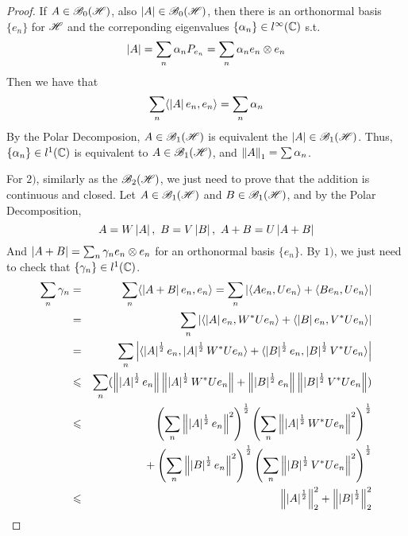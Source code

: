 \documentclass[a4paper,11pt]{report}
\begin{document}
\begin{proof}
	If $A \in \mathscr{B}_{0}\mathscr{(H)}$, also $\left\lvert A\right\lvert \in \mathscr{B}_{0}\mathscr{(H)}$, then there is an orthonormal basis $\{e_n\}$ for $\mathscr{H}$ and the correponding eigenvalues $\{\alpha_n\} \in l^{\infty}(\mathbb{C})$ s.t.
	\begin{equation*}
		\left\lvert A\right\lvert = \sum_{n} \alpha_n P_{e_n} = \sum_{n} \alpha_n e_n \otimes e_n
	\end{equation*}
	Then we have that
	\begin{equation*}
		\sum_n \langle \left\lvert A\right\lvert e_n, e_n \rangle = \sum_n \alpha_n
	\end{equation*}
	By the Polar Decomposion, $A \in \mathscr{B}_{1}\mathscr{(H)}$ is equivalent the $\left\lvert A\right\lvert \in \mathscr{B}_{1}\mathscr{(H)}$. Thus, $\{\alpha_n\} \in l^{1}(\mathbb{C})$ is equivalent to $A \in \mathscr{B}_{1}\mathscr{(H)}$, and $\left\lVert A\right\lVert_1 = \sum \alpha_n$.
	\item For $2)$, similarly as the $\mathscr{B}_{2}\mathscr{(H)}$, we just need to prove that the addition is continuous and closed. Let $A \in \mathscr{B}_{1}\mathscr{(H)}$ and $B \in \mathscr{B}_{1}\mathscr{(H)}$, and by the Polar Decomposition,
	\begin{equation*}
		A = W\left\lvert A\right\lvert,~ B = V \left\lvert B\right\lvert,~ A+B = U\left\lvert A+B\right\lvert
	\end{equation*}
	And $\left\lvert A+B\right\lvert = \sum_{n} \gamma_n e_n \otimes e_n$ for an orthonormal basis $\{e_n\}$. By $1)$, we just need to check that $\{\gamma_n\} \in l^{1}(\mathbb{C})$.
	\begin{eqnarray*}
		\sum_n \gamma_n &=& \sum_n \langle \abs{A+B}e_n,e_n \rangle = \sum_n \abs{\langle Ae_n, Ue_n \rangle + \langle Be_n, Ue_n \rangle} \\
		&=& \sum_n \abs{\langle \abs{A}e_n, \st{W}Ue_n \rangle + \langle \abs{B}e_n, \st{V}Ue_n \rangle} \\
		&=& \sum_n \abs{\langle \abs{A}^{\frac{1}{2}}e_n, \abs{A}^{\frac{1}{2}}\st{W}Ue_n \rangle + \langle \abs{B}^{\frac{1}{2}}e_n, \abs{B}^{\frac{1}{2}}\st{V}Ue_n \rangle} \\
		&\leqslant& \sum_n (\norm{\abs{A}^{\frac{1}{2}}e_n}\norm{\abs{A}^{\frac{1}{2}}\st{W}Ue_n}+\norm{\abs{B}^{\frac{1}{2}}e_n}\norm{\abs{B}^{\frac{1}{2}}\st{V}Ue_n}) \\
		&\leqslant& \left(\sum_n \norm{\abs{A}^{\frac{1}{2}}e_n}^2 \right)^{\frac{1}{2}}\left(\sum_n \norm{\abs{A}^{\frac{1}{2}}\st{W}Ue_n}^2 \right)^{\frac{1}{2}} \\
		&& \negmedspace{} + \left(\sum_n \norm{\abs{B}^{\frac{1}{2}}e_n}^2 \right)^{\frac{1}{2}}\left(\sum_n \norm{\abs{B}^{\frac{1}{2}}\st{V}Ue_n}^2 \right)^{\frac{1}{2}} \\
		&\leqslant& \norm{\abs{A}^{\frac{1}{2}}}_2^2 + \norm{\abs{B}^{\frac{1}{2}}}_2^2 \\

\end{eqnarray*}
\end{proof}
\end{document}
